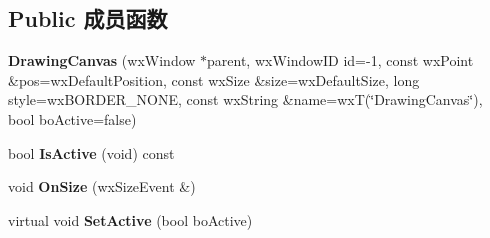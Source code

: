 \subsection*{Public 成员函数}
\begin{DoxyCompactItemize}
\item 
\hypertarget{class_drawing_canvas_a881bb87309826c92c0564de4363cbcd2}{{\bfseries Drawing\+Canvas} (wx\+Window $\ast$parent, wx\+Window\+I\+D id=-\/1, const wx\+Point \&pos=wx\+Default\+Position, const wx\+Size \&size=wx\+Default\+Size, long style=wx\+B\+O\+R\+D\+E\+R\+\_\+\+N\+O\+N\+E, const wx\+String \&name=wx\+T(\char`\"{}Drawing\+Canvas\char`\"{}), bool bo\+Active=false)}\label{class_drawing_canvas_a881bb87309826c92c0564de4363cbcd2}

\item 
\hypertarget{class_drawing_canvas_aab9f8216597135cd8f7ae1969dadbf74}{bool {\bfseries Is\+Active} (void) const }\label{class_drawing_canvas_aab9f8216597135cd8f7ae1969dadbf74}

\item 
\hypertarget{class_drawing_canvas_a1387ecc7ce03e14b61827e2d7b487a86}{void {\bfseries On\+Size} (wx\+Size\+Event \&)}\label{class_drawing_canvas_a1387ecc7ce03e14b61827e2d7b487a86}

\item 
\hypertarget{class_drawing_canvas_ae81952df1c2507b13d2d9bafd76812ac}{virtual void {\bfseries Set\+Active} (bool bo\+Active)}\label{class_drawing_canvas_ae81952df1c2507b13d2d9bafd76812ac}

\end{DoxyCompactItemize}
